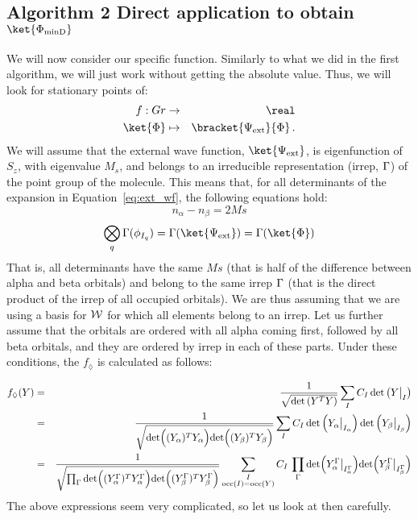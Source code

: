 \documentclass[a4paper,11pt]{article}
\begin{document}
\subsection{\textsf{\LARGE Algorithm 2}
  Direct application to obtain $\ket{\Phi_\text{minD}}$}
\label{sec:alg_two}

We will now consider our specific function.
Similarly to what we did in the first algorithm, we will just work without getting the absolute value.
Thus, we will look for stationary points of:
\begin{eqnarray}
  f : Gr &\to& \real\\
  \ket{\Phi} &\mapsto& \bracket{\Psi_\text{ext}}{\Phi}\,.
\end{eqnarray}
We will assume that the external wave function, $\ket{\Psi_\text{ext}}$, is eigenfunction of $S_z$, with eigenvalue $M_s$, and belongs to an irreducible representation (irrep, $\Gamma$) of the point group of the molecule.
This means that, for all determinants of the expansion in Equation~\eqref{eq:ext_wf}, the following equations hold:
\begin{equation}
  n_\alpha - n_\beta = 2 Ms
\end{equation}
\begin{equation}\label{eq:irrep_condition}
  \bigotimes_q \irp(\phi_{I_q}) = \irp(\ket{\Psi_\text{ext}}) = \irp(\ket{\Phi})
\end{equation}
That is, all determinants have the same $Ms$ (that is half of the difference between alpha and beta orbitals) and belong to the same irrep $\Gamma$ (that is the direct product of the irrep of all occupied orbitals).
We are thus assuming that we are using a basis for $\mathcal{W}{}$ for which all elements belong to an irrep.
Let us further assume that the orbitals are ordered with all alpha coming first, followed by all beta orbitals, and they are ordered by irrep in each of these parts.
Under these conditions, the $f_\lozenge$ is calculated as follows:

\begin{eqnarray}
  \label{eq:gen_f}
  f_\lozenge(Y)
  &=& \frac{1}{\sqrt{\text{det} \left( Y^T Y \right)}}
      \sum_{I} C_I \, \text{det} \left( Y\big|_I \right)\\
  &=& \frac{1}{\sqrt{
      \text{det} \Big( (Y_\alpha)^T Y_\alpha \Big)
      \text{det} \Big( (Y_\beta)^T Y_\beta \Big)
      }}
      \sum_{I} C_I \,
      \text{det} \left( Y_\alpha\big|_{I_\alpha} \right)
      \text{det} \left( Y_\beta\big|_{I_\beta} \right)\\\label{eq:f_diam_spin_irrep}
  &=& \frac{1}{\sqrt{
      \prod_{\Gamma}
      \text{det} \Big( (Y_\alpha^{\Gamma})^T Y_\alpha^{\Gamma} \Big)
      \text{det} \Big( (Y_\beta^{\Gamma})^T Y_\beta^{\Gamma} \Big)
      }}
      \sum_{\substack{I\\\text{occ}(I) = \text{occ}(Y)}} C_I \,
  \prod_{\Gamma}
  \text{det} \Big( Y_\alpha^{\Gamma}\big|_{I_\alpha^{\Gamma}} \Big)
  \text{det} \Big( Y_\beta^{\Gamma}\big|_{I_\beta^{\Gamma}} \Big)
\end{eqnarray}
The above expressions seem very complicated, so let us look at then carefully.
\end{document}
